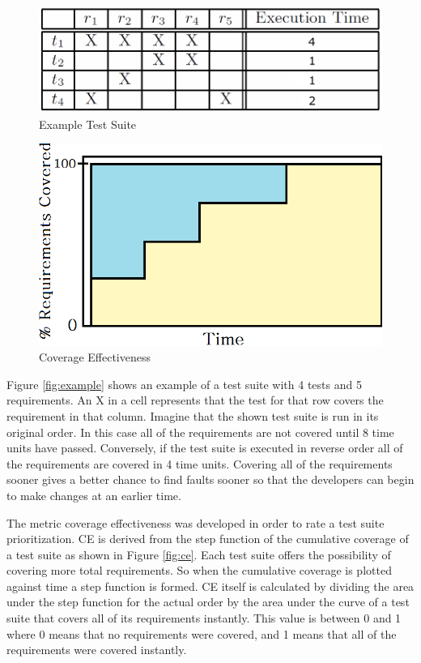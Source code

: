 \documentclass{vgtc}                          %
\begin{document}
\begin{figure}[t]
\centering
\includegraphics[scale=.2]{CoverageMatrix}
\caption{Example Test Suite}
\end{figure}
\label{fig:example}

\begin{figure}[ht]
\centering
\includegraphics[scale=.2]{ce}
\caption{Coverage Effectiveness}
\end{figure}
\label{fig:ce}

Figure \ref{fig:example} shows an example of a test suite with 4 tests and 5 requirements.  An X in a cell represents that the test for that row covers the requirement in that column.  Imagine that the shown test suite is run in its original order.  In this case all of the requirements are not covered until 8 time units have passed.  Conversely, if the test suite is executed in reverse order all of the requirements are covered in 4 time units.  Covering all of the requirements sooner gives a better chance to find faults sooner so that the developers can begin to make changes at an earlier time.  

The metric coverage effectiveness \cite{ce} was developed in order to rate a test suite prioritization.  CE is derived from the step function of the cumulative coverage of a test suite as shown in Figure \ref{fig:ce}.  Each test suite offers the possibility of covering more total requirements.  So when the cumulative coverage is plotted against time a step function is formed.  CE itself is calculated by dividing the area under the step function for the actual order by the area under the curve of a test suite that covers all of its requirements instantly.  This value is between 0 and 1 where 0 means that no requirements were covered, and 1 means that all of the requirements were covered instantly.
\end{document}
